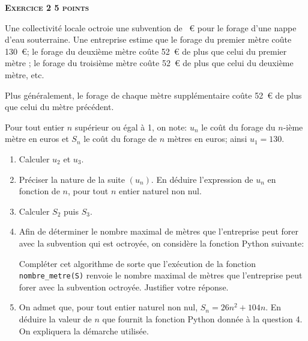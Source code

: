 \textbf{\large\textsc{Exercice 2 \hfill 5 points}}

\bigskip

Une collectivité locale octroie une subvention de ~\euro{} pour le forage d'une nappe d'eau souterraine. Une entreprise estime que le forage du premier mètre coûte 130~\euro; le
forage du deuxième mètre coûte 52~\euro{} de plus que celui du premier mètre ; le forage du
troisième mètre coûte 52~\euro{} de plus que celui du deuxième mètre, etc.

Plus généralement, le forage de chaque mètre supplémentaire coûte 52~\euro{} de plus que celui
du mètre précédent.

Pour tout entier $n$ supérieur ou égal à 1, on note: $u_n$ le coût du forage du $n$-ième mètre en
euros et $S_n$ le coût du forage de $n$ mètres en euros; ainsi $u_1=130$.

\medskip

\begin{enumerate}
\item Calculer $u_2$ et $u_3$.
\item Préciser la nature de la suite $\left(u_n\right)$. En déduire l'expression de $u_n$ en fonction de $n$, pour tout $n$ entier naturel non nul.
\item Calculer $S_2$ puis $S_3$.
\item Afin de déterminer le nombre maximal de mètres que l'entreprise peut forer avec la subvention qui est octroyée, on considère la fonction Python suivante:

\begin{center}
\end{center}
Compléter cet algorithme de sorte que l'exécution de la fonction \verb!nombre_metre(S)! renvoie le nombre maximal de mètres que l'entreprise peut forer avec la subvention octroyée. Justifier votre réponse.

\item On admet que, pour tout entier naturel non nul, $S_n=26n^2 +104n$. En déduire la valeur de
$n$ que fournit la fonction Python donnée à la question 4. On expliquera la démarche utilisée.
\end{enumerate}


